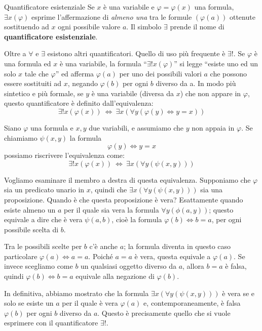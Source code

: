 \begin{defbox}{Quantificatore esistenziale}
	Se $x$ è una variabile e $\varphi = \varphi(x)$ una formula, $\exists x(\varphi)$ esprime l'affermazione di \textit{almeno una} tra le formule $(\varphi(a))$ ottenute sostituendo ad $x$ ogni possibile valore $a$.
	Il simbolo $\exists$ prende il nome di \textbf{quantificatore esistenziale}.
\end{defbox}

Oltre a $\forall$ e $\exists$ esistono altri quantificatori. Quello di uso più frequente è $\exists!$. Se $\varphi$ è una formula ed $x$ è una variabile, la formula ``$\exists!x(\varphi)$'' si legge ``esiste uno ed un solo $x$ tale che $\varphi$'' ed afferma $\varphi(a)$ per uno dei possibili valori $a$ che possono essere sostituiti ad $x$, negando $\varphi(b)$ per ogni $b$ diverso da a. In modo più sintetico e più formale, se $y$ è una variabile (diversa da $x$) che non appare in $\varphi$, questo quantificatore è definito dall'equivalenza:
\begin{equation}
	\exists! x(\varphi(x)) \ \iff \ \exists x(\forall y(\varphi(y)\iff y=x))
\end{equation}

Siano $\varphi$ una formula e $x,y$ due variabili, e assumiamo che $y$ non appaia in $\varphi$. Se chiamiamo $\psi(x,y)$ la formula $$\varphi(y) \iff y=x$$possiamo riscrivere l'equivalenza come:
\begin{displaymath}
	\exists! x(\varphi(x)) \ \iff \ \exists x(\forall y(\psi(x,y)))
\end{displaymath}

Vogliamo esaminare il membro a destra di questa equivalenza. Supponiamo che $\varphi$ sia un predicato unario in $x$, quindi che $\exists x (\forall y (\psi(x,y)))$ sia una proposizione. Quando è che questa proposizione è vera? Esattamente quando esiste almeno un $a$ per il quale sia vera la formula $\forall y(\phi(a,y))$; questo equivale a dire che è vera $\psi(a,b)$, cioè la formula $\varphi(b) \iff b=a$, per ogni possibile scelta di $b$.

Tra le possibili scelte per $b$ c'è anche $a$; la formula diventa in questo caso particolare $\varphi(a) \iff a = a$. Poiché $a=a$ è vera, questa equivale a $\varphi(a)$. Se invece scegliamo come $b$ un qualsiasi oggetto diverso da $a$, allora $b=a$ è falsa, quindi $\varphi(b)\iff b=a$ equivale alla negazione di $\varphi(b)$.

In definitiva, abbiamo mostrato che la formula $\exists x(\forall y(\psi(x,y)))$ è vera se e solo se esiste un $a$ per il quale è vera $\varphi(a)$ e, contemporaneamente, è falsa $\varphi(b)$ per ogni $b$ diverso da $a$. Questo è precisamente quello che si vuole esprimere con il quantificatore $\exists!$.

